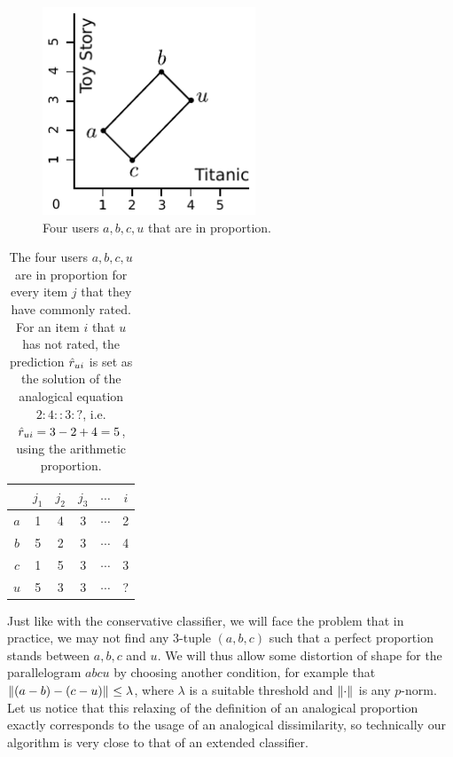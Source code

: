 \begin{figure}[!h]
\centering
  \includegraphics[width=2.5in]{figures/analogical_recommendation.pdf}
  \caption{Four users $a, b, c, u$ that are in proportion.}
\label{FIG:analogical_recommendation}
\end{figure}

\begin{table}[h!]
\centering
  \begin{tabular}{ c   c  c  c  c  c  }
\toprule
 & $j_1$ & $j_2$ & $j_3$ & $\cdots$ & $i$\\
  \midrule
$a$ & 1 & 4  & 3 & $\cdots$ & 2 \\
$b$ & 5 & 2  & 3 & $\cdots$ & 4 \\
$c$ & 1 & 5  & 3 & $\cdots$ & 3 \\
$u$ & 5 & 3  & 3 & $\cdots$ & ? \\
\bottomrule
\end{tabular}
\caption{The four users $a, b, c, u$ are in proportion for every item $j$ that
  they have commonly rated. For an item $i$ that $u$ has not rated, the
  prediction $\hat{r}_{ui}$ is set as the solution of the analogical equation
  $2:4::3:?$, i.e. $\hat{r}_{ui} = 3 - 2 + 4 = 5$, using the arithmetic proportion.}
\label{TAB:analogical_recommendation}
\end{table}

Just like with the conservative classifier, we will face the problem that in
practice, we may not find any $3$-tuple $(a, b, c)$ such that a perfect
proportion stands between $a, b, c$ and $u$. We will thus allow some distortion
of shape for the parallelogram $abcu$ by choosing another condition, for
example that ${\left\lVert(a-b) - (c-u)\right\rVert}_{} \leq \lambda$, where $\lambda$ is a
suitable threshold and ${\left\lVert\cdot\right\rVert}_{}$ is any $p$-norm. Let us notice that this
relaxing of the definition of an analogical proportion exactly corresponds to
the usage of an analogical dissimilarity, so technically our algorithm is very
close to that of an extended classifier.

